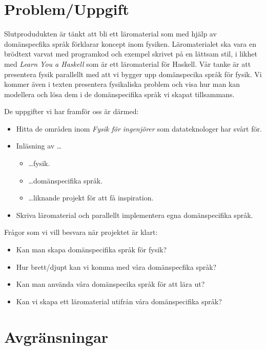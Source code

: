 \documentclass[12pt,a4paper]{article}
\begin{document}
\section{Problem/Uppgift}

Slutprodudukten är tänkt att bli ett läromaterial som med hjälp av domänspecfika
språk förklarar koncept inom fysiken. Läromaterialet ska vara en brödtext varvat
med programkod och exempel skrivet på en lättsam stil, i likhet med
\textit{Learn You a Haskell}\cite{LYAH} som är ett läromaterial för Haskell. Vår
tanke är att presentera fysik parallellt med att vi bygger upp domänspecika
språk för fysik. Vi kommer även i texten presentera fysikaliska problem och visa
hur man kan modellera och lösa dem i de domänspecifika språk vi skapat
tillsammans.

De uppgifter vi har framför oss är därmed:

\begin{itemize}
        \item Hitta de områden inom \textit{Fysik för ingenjörer} som
          datateknologer har svårt för.  \item Inläsning av \dots
	\begin{itemize}
		\item \dots fysik.
		\item \dots domänspecifika språk.
		\item \dots liknande projekt för att få inspiration.
	\end{itemize}
        \item Skriva läromaterial och parallellt implementera egna
      domänspecifika språk.  
\end{itemize}


Frågor som vi vill besvara när projektet är klart:
\begin{itemize}
    \item Kan man skapa domänspecifika språk för fysik?
    \item Hur brett/djupt kan vi komma med våra domänspecfika språk?
    \item Kan man använda våra domänspecika språk för att lära ut?
    \item Kan vi skapa ett läromaterial utifrån våra domänspecifika språk?
\end{itemize}

\section{Avgränsningar}
\end{document}
